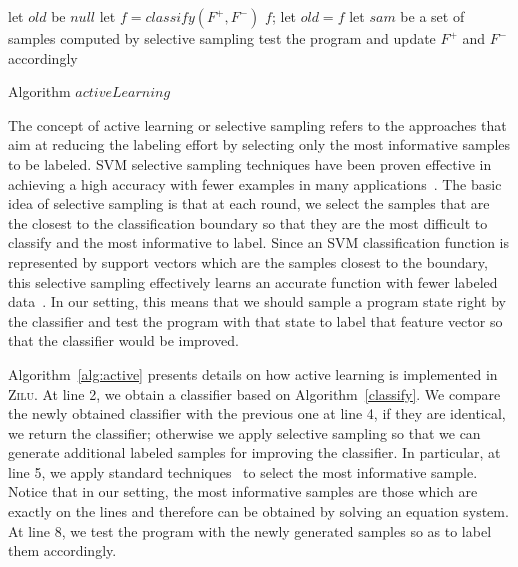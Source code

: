 \begin{algorithm}[t]
\SetAlgoVlined
\Indm
{}
\Indp
let $old$ be $null$\;
 {
    let $f = classify(F^+, F^-)$\;
     {
        \Return $f$;
    }
    let $old = f$\;
    let $sam$ be a set of samples computed by selective sampling\;
    test the program and update $F^+$ and $F^-$ accordingly\;
}
\caption{Algorithm $activeLearning$}
\label{alg:active}
\end{algorithm}

The concept of active learning or selective sampling refers to the approaches 
that aim at reducing the labeling effort by selecting only the most informative samples to be labeled. 
SVM selective sampling techniques have been proven effective in achieving a high accuracy 
with fewer examples in many applications~\cite{DBLP:conf/mm/TongC01,DBLP:journals/jmlr/TongK01}. 
The basic idea of selective sampling is that at each round, 
we select the samples that are the closest to the classification boundary so that they are the most difficult to classify and the most informative to label. 
Since an SVM classification function is represented by support vectors which are the samples closest to the boundary, 
this selective sampling effectively learns an accurate function with fewer labeled data~\cite{DBLP:conf/icml/SchohnC00}. 
In our setting, this means that we should sample a program state right by the classifier and test the program 
with that state to label that feature vector so that the classifier would be improved.

Algorithm~\ref{alg:active} presents details on how active learning is implemented in \textsc{Zilu}. 
At line 2, we obtain a classifier based on Algorithm~\ref{classify}. 
We compare the newly obtained classifier with the previous one at line 4, if they are identical, we return the classifier; 
otherwise we apply selective sampling so that we can generate additional labeled samples for improving the classifier. 
In particular, at line 5, we apply standard techniques~\cite{DBLP:conf/icml/SchohnC00} to select the most informative sample. 
Notice that in our setting, the most informative samples are those which are exactly on the lines and therefore can be obtained by solving an equation system. 
At line 8, we test the program with the newly generated samples so as to label them accordingly.

